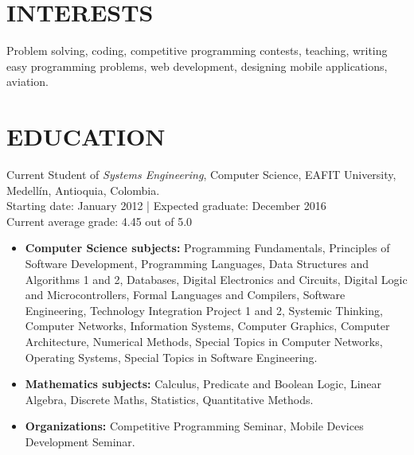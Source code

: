\documentclass[margin, 10pt]{res} %
\begin{document}
\begin{resume}


\section{INTERESTS}

Problem solving, coding, competitive programming contests, teaching, writing easy programming
problems, web development, designing mobile applications, aviation.


\section{EDUCATION}

Current Student of {\sl Systems Engineering}, Computer Science, EAFIT University, Medellín,
Antioquia, Colombia. \\
Starting date: January 2012 | Expected graduate: December 2016 \\
Current average grade: 4.45 out of 5.0
\begin{itemize}
  \item \textbf{Computer Science subjects:} Programming Fundamentals, Principles of Software
                Development, Programming Languages, Data Structures and Algorithms 1 and 2,
                Databases, Digital Electronics and Circuits, Digital Logic and Microcontrollers,
                Formal Languages and Compilers, Software Engineering,
                Technology Integration Project 1 and 2, Systemic Thinking, Computer Networks,
                Information Systems, Computer Graphics, Computer Architecture, Numerical Methods,
                Special Topics in Computer Networks, Operating Systems, Special Topics in Software
                Engineering.
  \item \textbf{Mathematics subjects:} Calculus, Predicate and Boolean Logic, Linear Algebra,
                                       Discrete Maths, Statistics, Quantitative Methods.
  \item \textbf{Organizations:} Competitive Programming Seminar, Mobile Devices Development Seminar.
\end{itemize}


\end{resume}
\end{document}
